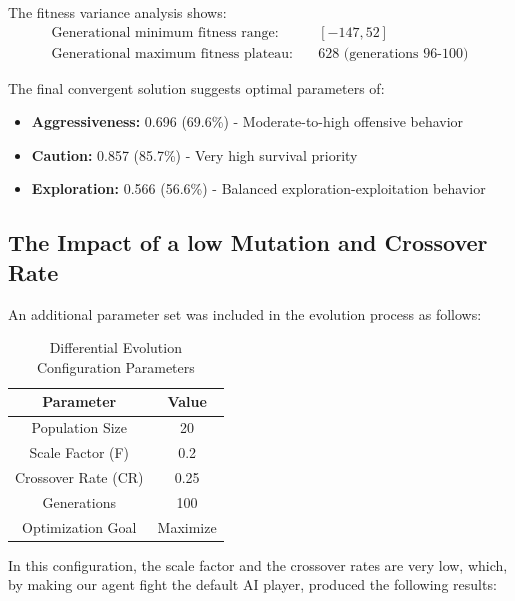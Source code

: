 \documentclass[sigconf]{acmart} %
\begin{document}
The fitness variance analysis shows:
\begin{align}
\text{Generational minimum fitness range:} &\quad [-147, 52] \\
\text{Generational maximum fitness plateau:} &\quad 628 \text{ (generations 96-100)}
\end{align}

The final convergent solution suggests optimal parameters of:
\begin{itemize}
    \item \textbf{Aggressiveness:} 0.696 (69.6\%) - Moderate-to-high offensive behavior
    \item \textbf{Caution:} 0.857 (85.7\%) - Very high survival priority
    \item \textbf{Exploration:} 0.566 (56.6\%) - Balanced exploration-exploitation behavior
\end{itemize}

\subsection{The Impact of a low Mutation and Crossover Rate}
An additional parameter set was included in the evolution process as follows:

\begin{table}[htbp]
\centering
\caption{Differential Evolution Configuration Parameters}
\begin{tabular}{c|c}
\hline
\textbf{Parameter} & \textbf{Value} \\
\hline
Population Size & 20 \\
\hline
Scale Factor (F) & 0.2 \\
\hline
Crossover Rate (CR) & 0.25 \\
\hline
Generations & 100 \\
\hline
Optimization Goal & Maximize \\
\hline
\end{tabular}
\end{table}

In this configuration, the scale factor and the crossover rates are very low, which, by making our agent fight the default AI player, produced the following results:
\end{document}
